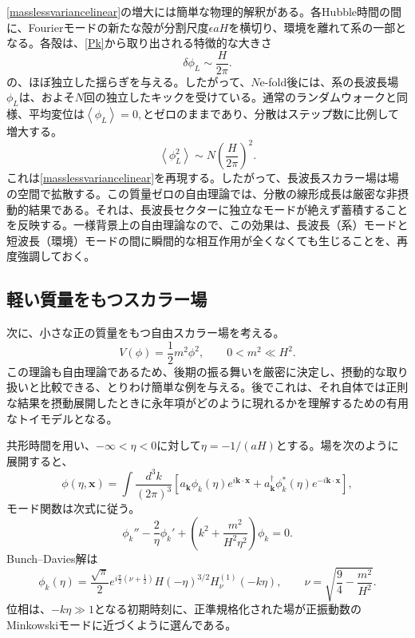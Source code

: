 \documentclass[a4paper,11pt,oneside]{article}
\theoremstyle{definition}
\numberwithin{equation}{section}
\begin{document}
\eqref{masslessvariancelinear}の増大には簡単な物理的解釈がある。各Hubble時間の間に、Fourierモードの新たな殻が分割尺度$ \epsilon a H$を横切り、環境を離れて系の一部となる。各殻は、\eqref{Pk}から取り出される特徴的な大きさ
\begin{equation}
\delta\phi_{L}
\sim
\frac{H}{2\pi}.
\end{equation}
の、ほぼ独立した揺らぎを与える。したがって、\(N\)e-fold後には、系の長波長場$ \phi_{L}$は、およそ\(N\)回の独立したキックを受けている。通常のランダムウォークと同様、平均変位は\(
\left\langle
\phi_{L}
\right\rangle
=
0,
\)とゼロのままであり、分散はステップ数に比例して増大する。
\begin{equation}
\left\langle
\phi_{L}^{2}
\right\rangle
\sim
N
\left(
\frac{H}{2\pi}
\right)^{2}.
\end{equation}
これは\eqref{masslessvariancelinear}を再現する。したがって、長波長スカラー場は場の空間で拡散する。この質量ゼロの自由理論では、分散の線形成長は厳密な非摂動的結果である。それは、長波長セクターに独立なモードが絶えず蓄積することを反映する。一様背景上の自由理論なので、この効果は、長波長（系）モードと短波長（環境）モードの間に瞬間的な相互作用が全くなくても生じることを、再度強調しておく。





\subsection{軽い質量をもつスカラー場}
\label{sec:light-massive-scalar}



次に、小さな正の質量をもつ自由スカラー場を考える。
\begin{equation}
V(\phi)
=
\frac{1}{2}m^{2}\phi^{2},
\qquad
0<m^{2}\ll H^{2}.
\end{equation}
この理論も自由理論であるため、後期の振る舞いを厳密に決定し、摂動的な取り扱いと比較できる、とりわけ簡単な例を与える。後でこれは、それ自体では正則な結果を摂動展開したときに永年項がどのように現れるかを理解するための有用なトイモデルとなる。



共形時間を用い、\( -\infty<\eta<0\)に対して\(
\eta
=
-1/(aH)\)とする。場を次のように展開すると、
\begin{equation}
\phi(\eta,\mathbf{x})
=
\int\frac{d^{3}k}{(2\pi)^{3}}
\left[
a_{\mathbf{k}}
\phi_{k}(\eta)
e^{i\mathbf{k}\cdot\mathbf{x}}
+
a_{\mathbf{k}}^{\dagger}
\phi_{k}^{*}(\eta)
e^{-i\mathbf{k}\cdot\mathbf{x}}
\right],
\end{equation}
モード関数は次式に従う。
\begin{equation}
\phi_{k}''
-
\frac{2}{\eta}\phi_{k}'
+
\left(
k^{2}
+
\frac{m^{2}}{H^{2}\eta^{2}}
\right)
\phi_{k}
=
0.
\end{equation}
Bunch--Davies解は
\begin{equation}
\phi_{k}(\eta)
=
\frac{\sqrt{\pi}}{2}
e^{i\frac{\pi}{2}\left(\nu+\frac{1}{2}\right)}
H(-\eta)^{3/2}
H_{\nu}^{(1)}(-k\eta),
\qquad
\nu
=
\sqrt{
\frac{9}{4}
-
\frac{m^{2}}{H^{2}}
}.
\label{massiveBDmode}
\end{equation}
位相は、\(-k\eta\gg1\)となる初期時刻に、正準規格化された場が正振動数のMinkowskiモードに近づくように選んである。
\end{document}
